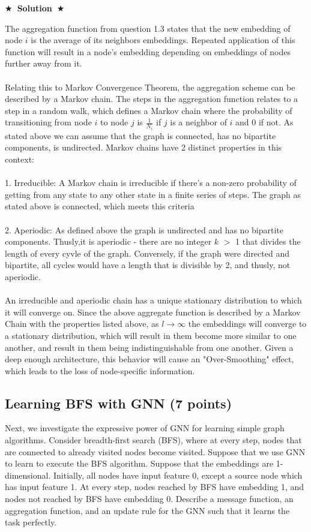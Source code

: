 \documentclass{article}
\numberwithin{figure}{section}
\newcommand{\Solution}[1]{{\medskip \color{red} \bf $\bigstar$~\sf \textbf{Solution}~$\bigstar$ \sf #1 } \bigskip}
\begin{document}
\Solution{

The aggregation function from question 1.3 states that the new embedding of node $i$ is the average of its neighbors embeddings. Repeated application of this function will result in a node's embedding depending on embeddings of nodes further away from it.\\\\
Relating this to Markov Convergence Theorem, the aggregation scheme can be described by a Markov chain. The steps in the aggregation function relates to a step in a random walk, which defines a Markov chain where the probability of transitioning from node $i$ to node $j$ is $\frac{1}{N_i}$ if $j$ is a neighbor of $i$ and 0 if not. As stated above we can assume that the graph is connected, has no bipartite components, is undirected. Markov chains have 2 distinct properties in this context:
\\
\\
1. Irreducible: A Markov chain is irreducible if there's a non-zero probability of getting from any state to any other state in a finite series of steps. The graph as stated above is connected, which meets this criteria
\\\\
2. Aperiodic: As defined above the graph is undirected and has no bipartite components. Thusly,it is aperiodic - there are no integer $k$ $>$ 1 that divides the length of every cyvle of the graph. Conversely, if the graph were directed and bipartite, all cycles would have a length that is divisible by 2, and thusly, not aperiodic.
\\\\
An irreducible and aperiodic chain has a unique stationary distribution to which it will converge on. Since the above aggregate function is described by a Markov Chain with the properties listed above, as $l \rightarrow \infty$ the embeddings will converge to a stationary distribution, which will result in them become more similar to one another, and result in them being indistinguishable from one another. Given a deep enough architecture, this behavior will cause an "Over-Smoothing" effect, which leads to the loss of node-specific information.

}


\subsection{Learning BFS with GNN (7 points)}

Next, we investigate the expressive power of GNN for learning simple graph algorithms. Consider breadth-first search (BFS), where at every step, nodes that are connected to already visited nodes become visited. Suppose that we use GNN to learn to execute the BFS algorithm. Suppose that the embeddings are 1-dimensional. Initially, all nodes have input feature 0, except a source node which has input feature 1. At every step, nodes reached by BFS have embedding 1, and nodes not reached by BFS have embedding 0. Describe a message function, an aggregation function, and an update rule for the GNN such that it learns the task perfectly.
\end{document}
